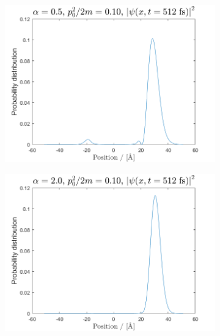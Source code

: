 \begin{figure}[H]
\begin{subfigure}[t]{0.47\textwidth}
	\includegraphics[width=\textwidth]{graphics/task3/a1e2.png}
	\caption{}
	\label{fig:3_c}
\end{subfigure}
\begin{subfigure}[t]{0.47\textwidth}
	\includegraphics[width=\textwidth]{graphics/task3/a2e2.png}
	\caption{}
	\label{fig:3_d}
\end{subfigure}


\end{figure}
